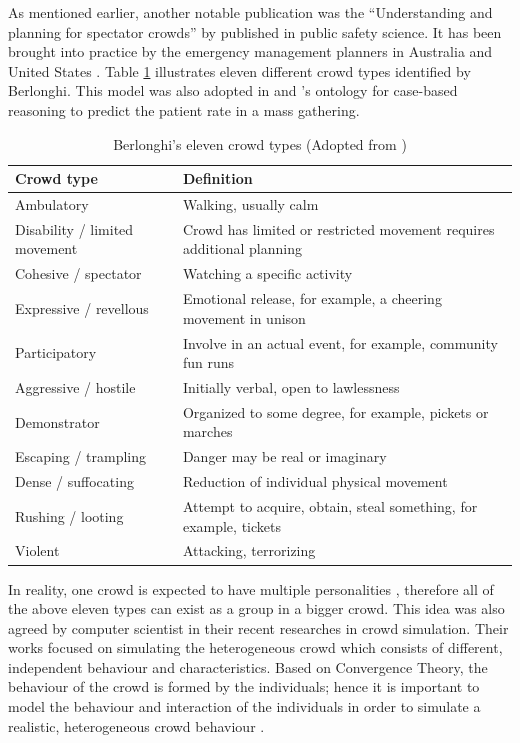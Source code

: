 As mentioned earlier, another notable publication was the ``Understanding and planning for spectator crowds'' by \citet{Berlonghi1995} published in public safety science. It has been brought into practice by the emergency management planners in Australia \citep{EMA1999} and United States \citep{FEMA2005}. Table \ref{table:berlonghiCrowdType} illustrates eleven different crowd types identified by Berlonghi. This model was also adopted in \citet{DelirHaghighi2013a} and \citet{Arbon2007}’s ontology for case-based reasoning to predict the patient rate in a mass gathering.

\begin{table}
	\caption{Berlonghi's eleven crowd types (Adopted from \citet{Zeitz2009})}
	\label{table:berlonghiCrowdType}
	\centering
	\begin{tabular}{|l|p{8cm}|}
		\hline
		\textbf{Crowd type} & \textbf{Definition} \\ \hline \hline
		Ambulatory & Walking, usually calm  \\ \hline
		Disability / limited movement & Crowd has limited or restricted movement requires additional planning \\ \hline
		Cohesive / spectator & Watching a specific activity \\ \hline
		Expressive / revellous & Emotional release, for example, a cheering movement in unison \\ \hline
		Participatory & Involve in an actual event, for example, community fun runs \\ \hline
		Aggressive / hostile & Initially verbal, open to lawlessness \\ \hline
		Demonstrator & Organized to some degree, for example, pickets or marches \\ \hline
		Escaping / trampling & Danger may be real or imaginary \\ \hline
		Dense / suffocating & Reduction of individual physical movement \\ \hline
		Rushing / looting & Attempt to acquire, obtain, steal something, for example, tickets \\ \hline
		Violent & Attacking, terrorizing \\ \hline
	\end{tabular}
\end{table}

In reality, one crowd is expected to have multiple personalities \citep{Berlonghi1995}, therefore all of the above eleven types can exist as a group in a bigger crowd. This idea was also agreed by computer scientist in their recent researches in crowd simulation. Their works focused on simulating the heterogeneous crowd which consists of different, independent behaviour and characteristics. Based on Convergence Theory, the behaviour of the crowd is formed by the individuals; hence it is important to model the behaviour and interaction of the individuals in order to simulate a realistic, heterogeneous crowd behaviour \citep{Guy2011}.

